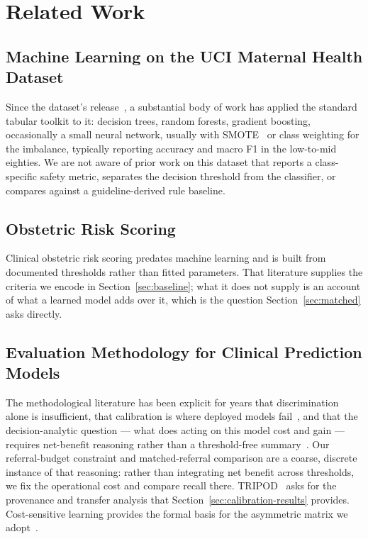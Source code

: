 \documentclass[journal]{IEEEtran}
\begin{document}
\section{Related Work}

\subsection{Machine Learning on the UCI Maternal Health Dataset}
Since the dataset's release~\cite{uci-maternal-health,ahmed-iot-maternal}, a
substantial body of work has applied the standard tabular toolkit to it:
decision trees, random forests, gradient boosting, occasionally a small neural
network, usually with SMOTE~\cite{chawla2002smote} or class weighting for the
imbalance, typically reporting accuracy and macro F1 in the low-to-mid eighties.
We are not aware of prior work on this dataset that reports a class-specific
safety metric, separates the decision threshold from the classifier, or compares
against a guideline-derived rule baseline.

\subsection{Obstetric Risk Scoring}
Clinical obstetric risk scoring predates machine learning and is built from
documented thresholds rather than fitted parameters. That literature supplies
the criteria we encode in Section~\ref{sec:baseline}; what it does not supply is
an account of what a learned model adds over it, which is the question
Section~\ref{sec:matched} asks directly.

\subsection{Evaluation Methodology for Clinical Prediction Models}
The methodological literature has been explicit for years that discrimination
alone is insufficient, that calibration is where deployed models
fail~\cite{vancalster2019calibration,steyerberg2014abcd}, and that the
decision-analytic question --- what does acting on this model cost and gain ---
requires net-benefit reasoning rather than a threshold-free
summary~\cite{vickers2006dca}. Our referral-budget constraint and
matched-referral comparison are a coarse, discrete instance of that reasoning:
rather than integrating net benefit across thresholds, we fix the operational
cost and compare recall there. TRIPOD~\cite{tripod2015} asks for the provenance
and transfer analysis that Section~\ref{sec:calibration-results} provides.
Cost-sensitive learning provides the formal basis for the asymmetric matrix we
adopt~\cite{elkan2001cost}.
\end{document}
